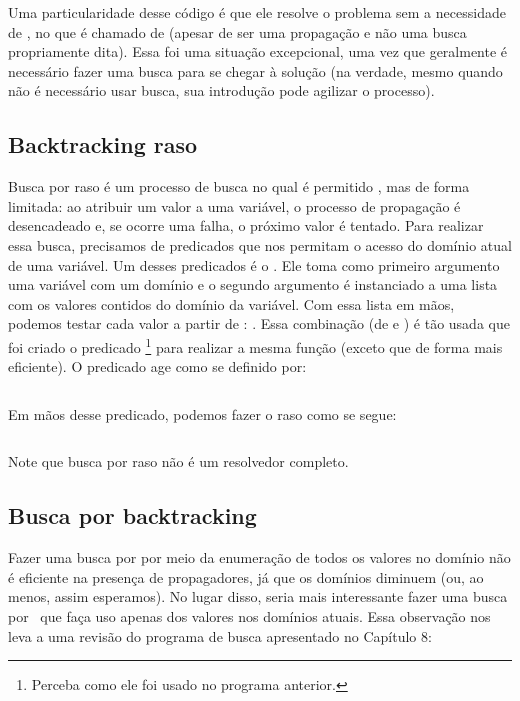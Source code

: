 \documentclass{article}
\begin{document}
Uma particularidade desse código é que ele resolve o problema sem a necessidade de
, no que é chamado de  (apesar de ser
uma propagação e não uma busca propriamente dita). Essa foi uma
situação excepcional, uma vez que geralmente é necessário fazer uma busca para se chegar à solução
(na verdade, mesmo quando não é necessário usar busca, sua introdução pode agilizar o processo).

\subsection{Backtracking raso}

Busca por  raso é um processo de busca no qual é permitido
, mas de forma limitada: ao atribuir um valor a uma variável, o processo de
propagação é desencadeado e, se ocorre uma falha, o próximo valor é tentado. Para realizar essa
busca, precisamos de predicados que nos permitam o acesso do domínio atual de uma variável. Um
desses predicados é o . Ele toma como primeiro argumento uma
variável com um domínio e o segundo argumento é instanciado a uma lista com os valores contidos do
domínio da variável. Com essa lista em mãos, podemos testar cada valor a partir de
: . Essa combinação
(de  e ) é tão usada que foi criado o predicado
\footnote{Perceba como ele foi usado no programa anterior.} para realizar a mesma
função (exceto que de forma mais eficiente). O predicado  age como se definido por:

\inputminted{prolog}{../Exemplos/Cap10/prog2_indomain.pl}

Em mãos desse predicado, podemos fazer o  raso como se segue:

\inputminted{prolog}{../Exemplos/Cap10/prog3_backraso.ecl}

Note que busca por  raso não é um resolvedor completo.

\subsection{Busca por backtracking}

Fazer uma busca por  por meio da enumeração de todos os valores no domínio
não é eficiente na presença de propagadores, já que os domínios diminuem (ou, ao menos, assim
esperamos). No lugar disso, seria mais interessante fazer uma busca por \backtracking\ que faça uso
apenas dos valores nos domínios atuais. Essa observação nos leva a uma revisão do programa de busca
apresentado no Capítulo 8: %
\end{document}
